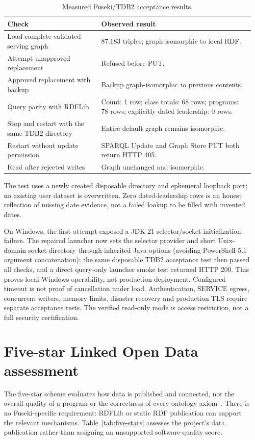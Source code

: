 \begin{table}[htbp]\centering\small
\caption{Measured Fuseki/TDB2 acceptance results.}\label{tab:fuseki-status}
\begin{tabularx}{\textwidth}{P{6.5cm}X}\toprule
Check & Observed result \\\midrule
Load complete validated serving graph & 87,183 triples; graph-isomorphic to local RDF. \\
Attempt unapproved replacement & Refused before PUT. \\
Approved replacement with backup & Backup graph-isomorphic to previous contents. \\
Query parity with RDFLib & Count: 1 row; class totals: 68 rows; programs: 78 rows; explicitly dated leadership: 0 rows. \\
Stop and restart with the same TDB2 directory & Entire default graph remains isomorphic. \\
Restart without update permission & SPARQL Update and Graph Store PUT both return HTTP 405. \\
Read after rejected writes & Graph unchanged and isomorphic. \\
\bottomrule\end{tabularx}
\end{table}

The test uses a newly created disposable directory and ephemeral loopback port; no existing
user dataset is overwritten. Zero dated-leadership rows is an honest reflection of missing
date evidence, not a failed lookup to be filled with invented dates.

On Windows, the first attempt exposed a JDK 21 selector/socket initialization failure.
The repaired launcher now sets the selector provider and short Unix-domain socket directory
through inherited Java options (avoiding PowerShell 5.1 argument concatenation); the same
disposable TDB2 acceptance test then passed all checks, and a direct query-only launcher
smoke test returned HTTP 200. This proves local Windows operability, not production deployment.
Configured timeout is not proof of cancellation under load. Authentication, SERVICE egress,
concurrent writers, memory limits, disaster recovery and production TLS require separate
acceptance tests. The verified read-only mode is access restriction, not a full security certification.

\section{Five-star Linked Open Data assessment}
\label{sec:five-star}
The five-star scheme evaluates how data is published and connected, not the overall
quality of a program or the correctness of every ontology axiom~\cite{five}. There is no
Fuseki-specific requirement: RDFLib or static RDF publication can support the relevant
mechanisms. Table~\ref{tab:five-stars} assesses the project's data publication rather than
assigning an unsupported software-quality score.

